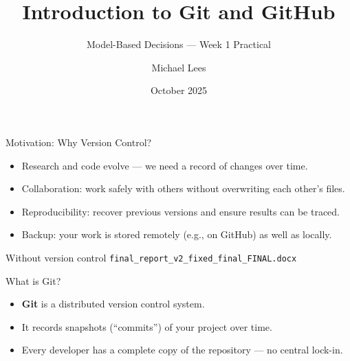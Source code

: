 \documentclass[aspectratio=169,13pt]{beamer}
\title{Introduction to Git and GitHub}
\subtitle{Model-Based Decisions — Week 1 Practical}
\author{Michael Lees}
\institute{Computational Science Lab, University of Amsterdam}
\date{October 2025}
\begin{document}
\begin{frame}
    \titlepage
\end{frame}

\begin{frame}{Motivation: Why Version Control?}
    \begin{itemize}
        \item Research and code evolve — we need a record of changes over time.
        \item Collaboration: work safely with others without overwriting each other's files.
        \item Reproducibility: recover previous versions and ensure results can be traced.
        \item Backup: your work is stored remotely (e.g., on GitHub) as well as locally.
    \end{itemize}
    \pause
    \vspace{1em}
    \begin{block}{Without version control}
        \texttt{final\_report\_v2\_fixed\_final\_FINAL.docx}
    \end{block}
\end{frame}

\begin{frame}{What is Git?}
    \begin{itemize}
        \item \textbf{Git} is a distributed version control system.
        \item It records snapshots (“commits”) of your project over time.
        \item Every developer has a complete copy of the repository — no central lock-in.
    \end{itemize}
    \vspace{1em}
    \begin{center}
    \end{center}
\end{frame}
\end{document}
